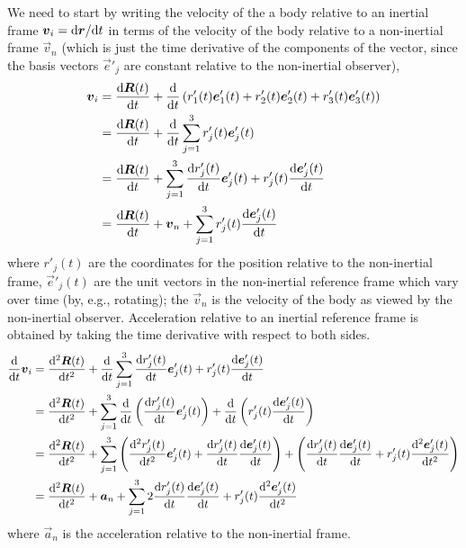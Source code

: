 \M
We need to start by writing the
velocity of the a body relative to an inertial frame
$\boldsymbol{v}_{i}=\mathrm{d}\boldsymbol{r}/\mathrm{d} t$ in
terms of the velocity of the body relative to a non-inertial frame
$\vec{v}_{n}$ (which is just the time derivative of the components of
the vector, since the basis vectors $\vec{e}'_{j}$ are constant relative to the
non-inertial observer),
\begin{align}
\boldsymbol{v}_{i} &=\frac{\mathrm{d}\boldsymbol{R}(t)}{\mathrm{d} t} + \frac{\mathrm{d}}{\mathrm{d} t}\left(r'_{1}(t)\boldsymbol{e}'_{1}(t) + r'_{2}(t)\boldsymbol{e}'_{2}(t) + r'_{3}(t)\boldsymbol{e}'_{3}(t)\right)\\
&=\frac{\mathrm{d}\boldsymbol{R}(t)}{\mathrm{d} t} + \frac{\mathrm{d}}{\mathrm{d} t}\sum^{3}_{j=1}r'_{j}(t)\boldsymbol{e}'_{j}(t)\\
&=\frac{\mathrm{d}\boldsymbol{R}(t)}{\mathrm{d} t} + \sum^{3}_{j=1}\frac{\mathrm{d} r'_{j}(t)}{\mathrm{d} t}\boldsymbol{e}'_{j}(t) +
r'_{j}(t)\frac{\mathrm{d}\boldsymbol{e}'_{j}(t)}{\mathrm{d} t}\\
&=\frac{\mathrm{d}\boldsymbol{R}(t)}{\mathrm{d} t} + \boldsymbol{v}_{n} + \sum^{3}_{j=1}r'_{j}(t)\frac{\mathrm{d}\boldsymbol{e}'_{j}(t)}{\mathrm{d} t}
\end{align}
where $r'_{j}(t)$ are the coordinates for the position relative to the
non-inertial frame, $\vec{e}'_{j}(t)$ are the unit vectors in the
non-inertial reference frame which vary over time (by, e.g., rotating); the
$\vec{v}_{n}$ is the velocity of the body as viewed by the non-inertial observer.
Acceleration relative to an inertial reference frame is obtained by
taking the time derivative with respect to both sides.
\begin{align}
  \frac{\mathrm{d}}{\mathrm{d} t}\boldsymbol{v}_{i}
  &= \frac{\mathrm{d}^{2}\boldsymbol{R}(t)}{\mathrm{d} t^{2}} + \frac{\mathrm{d}}{\mathrm{d} t}\sum^{3}_{j=1}\frac{\mathrm{d} r'_{j}(t)}{\mathrm{d} t}\boldsymbol{e}'_{j}(t) +
  r'_{j}(t)\frac{\mathrm{d}\boldsymbol{e}'_{j}(t)}{\mathrm{d} t}\\
  &= \frac{\mathrm{d}^{2}\boldsymbol{R}(t)}{\mathrm{d} t^{2}} + \sum^{3}_{j=1}\frac{\mathrm{d}}{\mathrm{d} t}\left(\frac{\mathrm{d} r'_{j}(t)}{\mathrm{d} t}\boldsymbol{e}'_{j}(t)\right) +
  \frac{\mathrm{d}}{\mathrm{d} t}\left(r'_{j}(t)\frac{\mathrm{d}\boldsymbol{e}'_{j}(t)}{\mathrm{d} t}\right)\\
  &= \frac{\mathrm{d}^{2}\boldsymbol{R}(t)}{\mathrm{d} t^{2}} + \sum^{3}_{j=1}\left(\frac{\mathrm{d}^{2} r'_{j}(t)}{\mathrm{d} t^{2}}\boldsymbol{e}'_{j}(t) +
  \frac{\mathrm{d} r'_{j}(t)}{\mathrm{d} t}\frac{\mathrm{d}\boldsymbol{e}'_{j}(t)}{\mathrm{d} t}\right) +
  \left(\frac{\mathrm{d} r'_{j}(t)}{\mathrm{d} t}\frac{\mathrm{d}\boldsymbol{e}'_{j}(t)}{\mathrm{d} t}
  +r'_{j}(t)\frac{\mathrm{d}^{2}\boldsymbol{e}'_{j}(t)}{\mathrm{d} t^{2}}\right)\\
&= \frac{\mathrm{d}^{2}\boldsymbol{R}(t)}{\mathrm{d} t^{2}} + \boldsymbol{a}_{n} + \sum^{3}_{j=1}2\frac{\mathrm{d} r'_{j}(t)}{\mathrm{d} t}\frac{\mathrm{d}\boldsymbol{e}'_{j}(t)}{\mathrm{d} t} +r'_{j}(t)\frac{\mathrm{d}^{2}\boldsymbol{e}'_{j}(t)}{\mathrm{d} t^{2}}
\end{align}
where $\vec{a}_{n}$ is the acceleration relative to the non-inertial frame.


